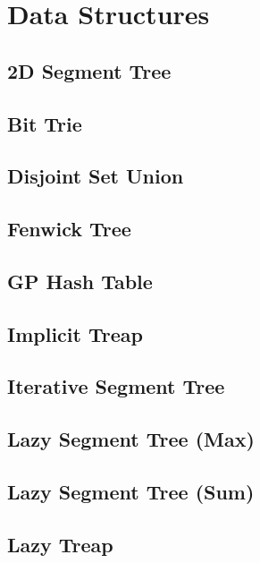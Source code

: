 \documentclass[10pt,letterpaper,landscape,twocolumn]{article}
\begin{document}
\section{Data Structures}
\subsection{2D Segment Tree}

\subsection{Bit Trie}

\subsection{Disjoint Set Union}

\subsection{Fenwick Tree}

\subsection{GP Hash Table}

\subsection{Implicit Treap}

\subsection{Iterative Segment Tree}

\subsection{Lazy Segment Tree (Max)}

\subsection{Lazy Segment Tree (Sum)}

\subsection{Lazy Treap}

\end{document}
